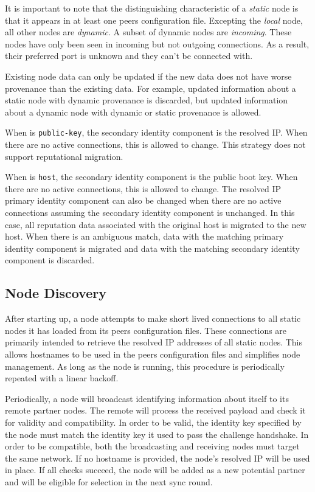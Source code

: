 It is important to note that the distinguishing characteristic of a \emph{static} node is that it appears in at least one peers configuration file.
Excepting the \emph{local} node, all other nodes are \emph{dynamic}.
A subset of dynamic nodes are \emph{incoming}.
These nodes have only been seen in incoming but not outgoing connections.
As a result, their preferred port is unknown and they can't be connected with.

Existing node data can only be updated if the new data does not have worse provenance than the existing data.
For example, updated information about a static node with dynamic provenance is discarded, but updated information about a dynamic node with dynamic or static provenance is allowed.

When  is \texttt{public-key}, the secondary identity component is the resolved IP.
When there are no active connections, this is allowed to change.
This strategy does not support reputational migration.

When  is \texttt{host}, the secondary identity component is the public boot key.
When there are no active connections, this is allowed to change.
The resolved IP primary identity component can also be changed when there are no active connections assuming the secondary identity component is unchanged.
In this case, all reputation data associated with the original host is migrated to the new host.
When there is an ambiguous match, data with the matching primary identity component is migrated and data with the matching secondary identity component is discarded.

\subsection{Node Discovery}
\label{sec:network:discovery}

After starting up, a node attempts to make short lived connections to all static nodes it has loaded from its peers configuration files.
These connections are primarily intended to retrieve the resolved IP addresses of all static nodes.
This allows hostnames to be used in the peers configuration files and simplifies node management.
As long as the node is running, this procedure is periodically repeated with a linear backoff.

Periodically, a node will broadcast identifying information about itself to its remote partner nodes.
The remote will process the received payload and check it for validity and compatibility.
In order to be valid, the identity key specified by the node must match the identity key it used to pass the challenge handshake.
In order to be compatible, both the broadcasting and receiving nodes must target the same network.
If no hostname is provided, the node's resolved IP will be used in place.
If all checks succeed, the node will be added as a new potential partner and will be eligible for selection in the next sync round.

